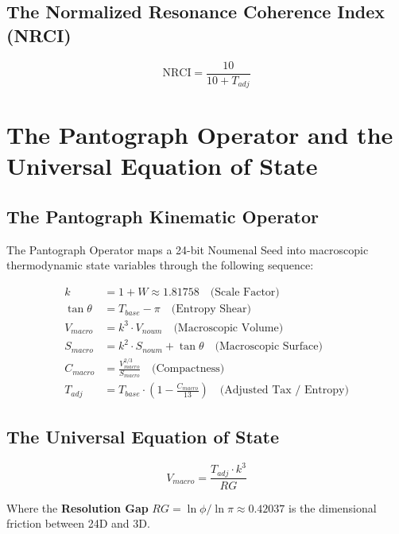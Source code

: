 \documentclass[12pt,a4paper]{article}
\begin{document}
\subsection{The Normalized Resonance Coherence Index (NRCI)}

\begin{equation}
\text{NRCI} = \frac{10}{10 + T_{adj}}
\end{equation}

\section{The Pantograph Operator and the Universal Equation of State}

\subsection{The Pantograph Kinematic Operator}

The Pantograph Operator maps a 24-bit Noumenal Seed into macroscopic thermodynamic state variables through the following sequence:

\begin{align}
k &= 1 + W \approx 1.81758 \quad \text{(Scale Factor)} \\
\tan \theta &= T_{base} - \pi \quad \text{(Entropy Shear)} \\
V_{macro} &= k^3 \cdot V_{noum} \quad \text{(Macroscopic Volume)} \\
S_{macro} &= k^2 \cdot S_{noum} + \tan \theta \quad \text{(Macroscopic Surface)} \\
C_{macro} &= \frac{V_{macro}^{2/3}}{S_{macro}} \quad \text{(Compactness)} \\
T_{adj} &= T_{base} \cdot \left(1 - \frac{C_{macro}}{13}\right) \quad \text{(Adjusted Tax / Entropy)}
\end{align}

\subsection{The Universal Equation of State}

\begin{equation}
\boxed{V_{macro} = \frac{T_{adj} \cdot k^3}{RG}}
\end{equation}

Where the \textbf{Resolution Gap} $RG = \ln\phi / \ln\pi \approx 0.42037$ is the dimensional friction between 24D and 3D.
\end{document}
